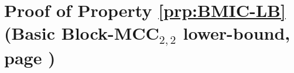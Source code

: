 \section{Proof of Property \ref{prp:BMIC-LB} (Basic Block-MCC$_{2,2}$ lower-bound, page \pageref{prp:BMIC-LB})}
\label{prf:BMIC-LB} 

\newpage
